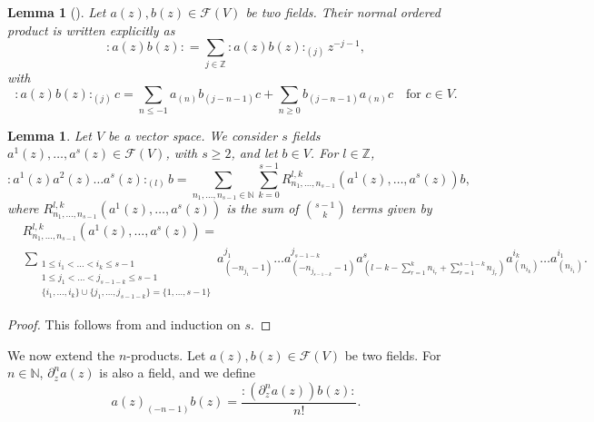\documentclass[a4paper, 12pt, reqno]{amsart}
\newtheorem{lemma}[theorem]{Lemma}
\theoremstyle{remark}
\begin{document}
\begin{lemma}[{\cite[Proposition 3.3.3]{nozaradan_introduction_2008}}]
  \label{lmm:1}
  Let $a(z), b(z) \in \mathcal{F}(V)$ be two fields.
  Their normal ordered product is written explicitly as
  \begin{equation*}
    :a(z)b(z): = \sum_{j \in \mathbb{Z}}:a(z)b(z):_{(j)}z^{-j - 1},
  \end{equation*}
  with
  \begin{equation*}
    :a(z)b(z):_{(j)}c = \sum_{n \le -1}a_{(n)}b_{(j - n - 1)}c + \sum_{n \ge 0}b_{(j - n - 1)}a_{(n)}c \quad \text{for $c \in V$}.
  \end{equation*}
\end{lemma}

\begin{lemma}
  \label{lmm:2}
  Let $V$ be a vector space.
  We consider $s$ fields $a^1(z), \dots, a^s(z) \in \mathcal{F}(V)$, with $s \ge 2$, and let $b \in V$.
  For $l \in \mathbb{Z}$,
  \begin{equation*}
    :a^1(z)a^2(z)\dots a^s(z):_{(l)}b = \sum_{n_1, \dots, n_{s - 1} \in \mathbb{N}}\sum_{k = 0}^{s - 1}R^{l, k}_{n_1, \dots, n_{s - 1}}(a^1(z), \dots, a^s(z))b,
  \end{equation*}
  where $R^{l, k}_{n_1, \dots, n_{s - 1}}(a^1(z), \dots, a^s(z))$ is the sum of $\binom{s - 1}{k}$ terms given by
  \begin{align*}
    &R^{l, k}_{n_1, \dots, n_{s - 1}}(a^1(z), \dots, a^s(z)) = \\
    &\sum_{\substack{1 \le i_1 < \dots < i_k \le s - 1 \\ 1 \le j_1 < \dots < j_{s - 1 - k} \le s - 1 \\ \{i_1, \dots, i_k\} \cup \{j_1, \dots, j_{s - 1 - k}\} = \{1, \dots, s - 1\}}}a^{j_1}_{(-n_{j_1} - 1)}\dots a^{j_{s - 1 - k}}_{(-n_{j_{s - 1 - k}} - 1)}a^s_{(l - k - \sum_{r = 1}^kn_{i_r} + \sum_{r = 1}^{s - 1 - k}n_{j_r})}a^{i_k}_{(n_{i_k})}\dots a^{i_1}_{(n_{i_1})}.
  \end{align*}
\end{lemma}

\begin{proof}
  This follows from  and induction on $s$.
\end{proof}

We now extend the $n$-products.
Let $a(z), b(z) \in \mathcal{F}(V)$ be two fields.
For $n \in \mathbb{N}$, $\partial^n_za(z)$ is also a field, and we define
\begin{equation}
  \label{eq:3}
  a(z)_{(-n - 1)}b(z) = \frac{:(\partial^n_za(z))b(z):}{n!}.
\end{equation}
\end{document}
